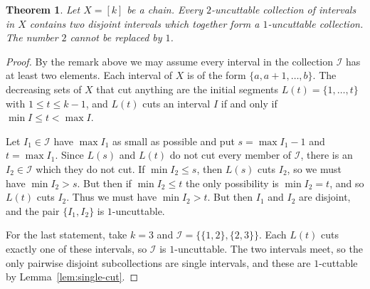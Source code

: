 \documentclass[10pt, a4paper]{article}
\theoremstyle{plain}
\newtheorem{theorem}{Theorem}[section]
\theoremstyle{definition}
\newcommand{\I}{\mathcal{I}}
\begin{document}
\begin{theorem}\label{thm:chain-conjecture}
  Let $X=[k]$ be a chain. Every $2$-uncuttable collection of intervals in $X$ contains
  two disjoint intervals which together form a $1$-uncuttable collection. The number
  $2$ cannot be replaced by $1$.
\end{theorem}

\begin{proof}
  By the remark above we may assume every interval in the collection $\I$ has at least
  two elements. Each interval of $X$ is of the form $\{a,a+1,\ldots,b\}$. The
  decreasing sets of $X$ that cut anything are the initial segments
  $L(t)=\{1,\ldots,t\}$ with $1\le t\le k-1$, and $L(t)$ cuts an interval $I$ if and
  only if $\min I\le t<\max I$.

  Let $I_1\in\I$ have $\max I_1$ as small as possible and put
  $s=\max I_1-1$ and $t=\max I_1$. Since $L(s)$ and $L(t)$ do not
  cut every member of $\I$, there is an $I_2\in\I$ which they do not cut. If $\min I_2\le s$,
  then $L(s)$ cuts $I_2$, so we must have $\min I_2 > s$. But then if $\min I_2 \le t$
  the only possibility is $\min I_2 = t$, and so $L(t)$ cuts $I_2$.
  Thus we must have $\min I_2 > t$. But then $I_1$ and $I_2$ are disjoint, and the pair
  $\{I_1,I_2\}$ is $1$-uncuttable.

  For the last statement, take $k=3$ and $\I=\{\{1,2\},\{2,3\}\}$. Each $L(t)$ cuts
  exactly one of these intervals, so $\I$ is $1$-uncuttable. The two intervals meet,
  so the only pairwise disjoint subcollections are single intervals, and these are
  $1$-cuttable by Lemma~\ref{lem:single-cut}.
\end{proof}
\end{document}
